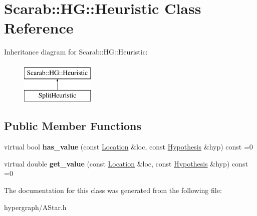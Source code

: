 \hypertarget{classScarab_1_1HG_1_1Heuristic}{
\section{Scarab::HG::Heuristic Class Reference}
\label{classScarab_1_1HG_1_1Heuristic}
}
Inheritance diagram for Scarab::HG::Heuristic:\begin{figure}[H]
\begin{center}
\leavevmode
\includegraphics[height=2cm]{classScarab_1_1HG_1_1Heuristic}
\end{center}
\end{figure}
\subsection*{Public Member Functions}
\begin{DoxyCompactItemize}
\item 
\hypertarget{classScarab_1_1HG_1_1Heuristic_afad5a99d38b6783521e4c670d3edcf0a}{
virtual bool {\bfseries has\_\-value} (const \hyperlink{structScarab_1_1HG_1_1Location}{Location} \&loc, const \hyperlink{structScarab_1_1HG_1_1Hypothesis}{Hypothesis} \&hyp) const =0}
\label{classScarab_1_1HG_1_1Heuristic_afad5a99d38b6783521e4c670d3edcf0a}

\item 
\hypertarget{classScarab_1_1HG_1_1Heuristic_aca6b5924257b35be9e65058062fdc0d5}{
virtual double {\bfseries get\_\-value} (const \hyperlink{structScarab_1_1HG_1_1Location}{Location} \&loc, const \hyperlink{structScarab_1_1HG_1_1Hypothesis}{Hypothesis} \&hyp) const =0}
\label{classScarab_1_1HG_1_1Heuristic_aca6b5924257b35be9e65058062fdc0d5}

\end{DoxyCompactItemize}


The documentation for this class was generated from the following file:\begin{DoxyCompactItemize}
\item 
hypergraph/AStar.h\end{DoxyCompactItemize}
